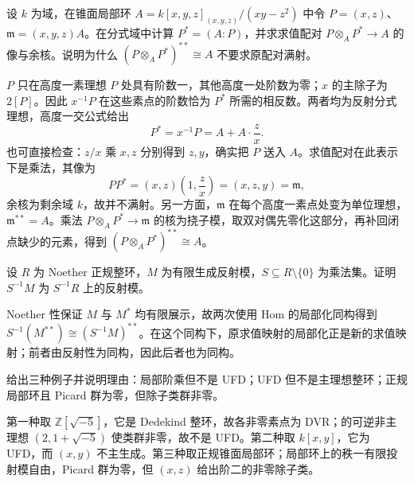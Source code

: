 \begin{optionalexercise}\label{b3:ex:20-rank-one-dual}
	设 \(k\) 为域，在锥面局部环 \(A=k[x,y,z]_{(x,y,z)}/(xy-z^2)\) 中令 \(P=(x,z)\)、\(\mathfrak m=(x,y,z)A\)。在分式域中计算 \(P^*=(A:P)\)，并求求值配对 \(P\otimes_AP^*\to A\) 的像与余核。说明为什么 \((P\otimes_AP^*)^{**}\cong A\) 不要求原配对满射。
\end{optionalexercise}
\begin{solution}
	\(P\) 只在高度一素理想 \(P\) 处具有阶数一，其他高度一处阶数为零；\(x\) 的主除子为 \(2[P]\)。因此 \(x^{-1}P\) 在这些素点的阶数恰为 \(P^*\) 所需的相反数。两者均为反射分式理想，高度一交公式给出
	\[
		P^*=x^{-1}P=A+A\cdot\frac zx.
	\]
	也可直接检查：\(z/x\) 乘 \(x,z\) 分别得到 \(z,y\)，确实把 \(P\) 送入 \(A\)。求值配对在此表示下是乘法，其像为
	\[
		PP^*=(x,z)\left(1,\frac zx\right)=(x,z,y)=\mathfrak m,
	\]
	余核为剩余域 \(k\)，故并不满射。另一方面，\(\mathfrak m\) 在每个高度一素点处变为单位理想，\(\mathfrak m^{**}=A\)。乘法 \(P\otimes_AP^*\to\mathfrak m\) 的核为挠子模，取双对偶先零化这部分，再补回闭点缺少的元素，得到 \((P\otimes_AP^*)^{**}\cong A\)。
\end{solution}

\begin{optionalexercise}\label{b3:ex:20-reflexive-localization}
	设 \(R\) 为 Noether 正规整环，\(M\) 为有限生成反射模，\(S\subseteq R\setminus\{0\}\) 为乘法集。证明 \(S^{-1}M\) 为 \(S^{-1}R\) 上的反射模。
\end{optionalexercise}
\begin{solution}
	Noether 性保证 \(M\) 与 \(M^*\) 均有限展示，故两次使用 Hom 的局部化同构得到 \(S^{-1}(M^{**})\cong(S^{-1}M)^{**}\)。在这个同构下，原求值映射的局部化正是新的求值映射；前者由反射性为同构，因此后者也为同构。
\end{solution}

\begin{optionalexercise}\label{b3:ex:20-picard-versus-class}
	给出三种例子并说明理由：局部阶乘但不是 UFD；UFD 但不是主理想整环；正规局部环且 Picard 群为零，但除子类群非零。
\end{optionalexercise}
\begin{solution}
	第一种取 \(\mathbb Z[\sqrt{-5}]\)，它是 Dedekind 整环，故各非零素点为 DVR；的可逆非主理想 \((2,1+\sqrt{-5})\) 使类群非零，故不是 UFD。第二种取 \(k[x,y]\)，它为 UFD，而 \((x,y)\) 不主生成。第三种取正规锥面局部环；局部环上的秩一有限投射模自由，Picard 群为零，但 \((x,z)\) 给出阶二的非零除子类。
\end{solution}
